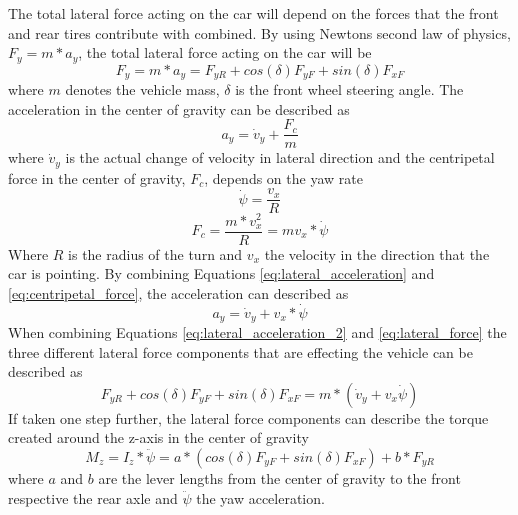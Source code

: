 The total lateral force acting on the car will depend on the forces that the front and rear tires contribute with combined. By using Newtons second law of physics, $ F_{y} = m*a_{y} $, the total lateral force acting on the car will be
\begin{equation} \label{eq:lateral_force}
	F_{y} = m*a_{y} = F_{yR} + cos(\delta)F_{yF} + sin(\delta)F_{xF} 
\end{equation}
where $ m $ denotes the vehicle mass, $ \delta $ is the front wheel steering angle. The acceleration in the center of gravity can be described as 
\begin{equation} \label{eq:lateral_acceleration}
	a_{y} = \dot v_{y} + \dfrac{F_{c}}{m}
\end{equation}
where $ \dot v_{y} $ is the actual change of velocity in lateral direction and the centripetal force in the center of gravity, $ F_{c} $, depends on the yaw rate
\begin{equation} \label{eq:yaw_rate}
	\dot \psi = \dfrac{v_{x}}{R}
\end{equation}
\begin{equation} \label{eq:centripetal_force}
	F_{c} = \dfrac{m*v^2_{x}}{R} = mv_{x}*\dot \psi
\end{equation}
Where $ R $ is the radius of the turn and $ v_{x} $ the velocity in the direction that the car is pointing. By combining Equations \ref{eq:lateral_acceleration} and \ref{eq:centripetal_force}, the acceleration can described as
\begin{equation} \label{eq:lateral_acceleration_2}
	a_{y} = \dot v_{y} + v_{x}*\dot \psi
\end{equation}
When combining Equations \ref{eq:lateral_acceleration_2} and \ref{eq:lateral_force} the three different lateral force components that are effecting the vehicle can be described as
\begin{equation} \label{lateral_forces_2}
	F_{yR} + cos(\delta)F_{yF} + sin(\delta)F_{xF} = m*(\dot v_{y} + v_{x}\dot \psi)
\end{equation}
If taken one step further, the lateral force components can describe the torque created around the z-axis in the center of gravity 
\begin{equation} \label{lateral_torque}
	M_{z} = I_{z}* \ddot \psi = a*(cos(\delta)F_{yF} + sin(\delta)F_{xF}) + b*F_{yR}
\end{equation}
where $ a $ and $ b $ are the lever lengths from the center of gravity to the front respective the rear axle and $ \ddot \psi $ the yaw acceleration. 

